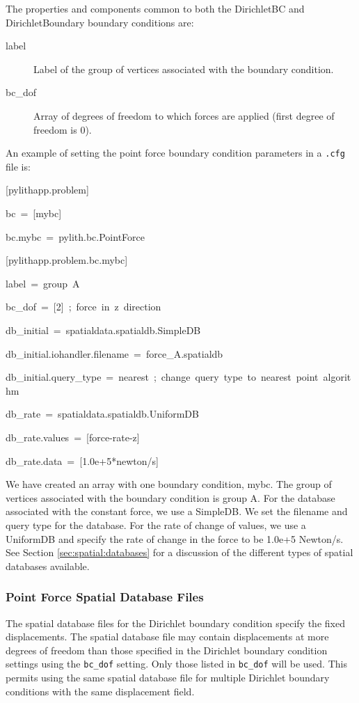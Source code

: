The properties and components common to both the DirichletBC and DirichletBoundary
boundary conditions are:
\begin{description}
\item [{label}] Label of the group of vertices associated with the boundary
condition.
\item [{bc\_dof}] Array of degrees of freedom to which forces are applied
(first degree of freedom is 0).
\end{description}
An example of setting the point force boundary condition parameters
in a \texttt{.cfg} file is:
\begin{lyxcode}
{[}pylithapp.problem{]}

bc~=~{[}mybc{]}

bc.mybc~=~pylith.bc.PointForce



{[}pylithapp.problem.bc.mybc{]}

label~=~group~A~

bc\_dof~=~{[}2{]}~;~force~in~z~direction

db\_initial~=~spatialdata.spatialdb.SimpleDB

db\_initial.iohandler.filename~=~force\_A.spatialdb

db\_initial.query\_type~=~nearest~;~change~query~type~to~nearest~point~algorithm

db\_rate~=~spatialdata.spatialdb.UniformDB

db\_rate.values~=~{[}force-rate-z{]}

db\_rate.data~=~{[}1.0e+5{*}newton/s{]}
\end{lyxcode}
We have created an array with one boundary condition, mybc. The group
of vertices associated with the boundary condition is group A. For
the database associated with the constant force, we use a SimpleDB.
We set the filename and query type for the database. For the rate
of change of values, we use a UniformDB and specify the rate of change
in the force to be 1.0e+5 Newton/s. See Section \vref{sec:spatial:databases}
for a discussion of the different types of spatial databases available.


\subsubsection{Point Force Spatial Database Files}

The spatial database files for the Dirichlet boundary condition specify
the fixed displacements. The spatial database file may contain displacements
at more degrees of freedom than those specified in the Dirichlet boundary
condition settings using the \texttt{bc\_dof} setting. Only those
listed in \texttt{bc\_dof} will be used. This permits using the same
spatial database file for multiple Dirichlet boundary conditions with
the same displacement field.

